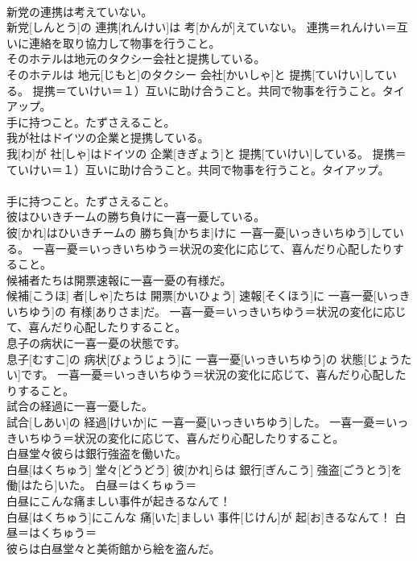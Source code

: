 \documentclass[8pt]{extreport}
\begin{document}
\begin{CJK}{UTF8}{min}
{\\	新党の連携は考えていない。	
\\	新党[しんとう]の 連携[れんけい]は 考[かんが]えていない。	連携＝れんけい＝互いに連絡を取り協力して物事を行うこと。
\\	そのホテルは地元のタクシー会社と提携している。	
\\	そのホテルは 地元[じもと]のタクシー 会社[かいしゃ]と 提携[ていけい]している。	提携＝ていけい＝１）互いに助け合うこと。共同で物事を行うこと。タイアップ。 　　　　　　　　
\\	手に持つこと。たずさえること。
\\	我が社はドイツの企業と提携している。	
\\	我[わ]が 社[しゃ]はドイツの 企業[きぎょう]と 提携[ていけい]している。	提携＝ていけい＝１）互いに助け合うこと。共同で物事を行うこと。タイアップ。 　　　　　　　　
\\	手に持つこと。たずさえること。
\\	彼はひいきチームの勝ち負けに一喜一憂している。	
\\	彼[かれ]はひいきチームの 勝ち負[かちま]けに 一喜一憂[いっきいちゆう]している。	一喜一憂＝いっきいちゆう＝状況の変化に応じて、喜んだり心配したりすること。
\\	候補者たちは開票速報に一喜一憂の有様だ。	
\\	候補[こうほ] 者[しゃ]たちは 開票[かいひょう] 速報[そくほう]に 一喜一憂[いっきいちゆう]の 有様[ありさま]だ。	一喜一憂＝いっきいちゆう＝状況の変化に応じて、喜んだり心配したりすること。
\\	息子の病状に一喜一憂の状態です。	
\\	息子[むすこ]の 病状[びょうじょう]に 一喜一憂[いっきいちゆう]の 状態[じょうたい]です。	一喜一憂＝いっきいちゆう＝状況の変化に応じて、喜んだり心配したりすること。
\\	試合の経過に一喜一憂した。	
\\	試合[しあい]の 経過[けいか]に 一喜一憂[いっきいちゆう]した。	一喜一憂＝いっきいちゆう＝状況の変化に応じて、喜んだり心配したりすること。
\\	白昼堂々彼らは銀行強盗を働いた。	
\\	白昼[はくちゅう] 堂々[どうどう] 彼[かれ]らは 銀行[ぎんこう] 強盗[ごうとう]を 働[はたら]いた。	白昼＝はくちゅう＝ 
\\	白昼にこんな痛ましい事件が起きるなんて！	
\\	白昼[はくちゅう]にこんな 痛[いた]ましい 事件[じけん]が 起[お]きるなんて！	白昼＝はくちゅう＝ 
\\	彼らは白昼堂々と美術館から絵を盗んだ。	
}
\end{CJK}
\end{document}
